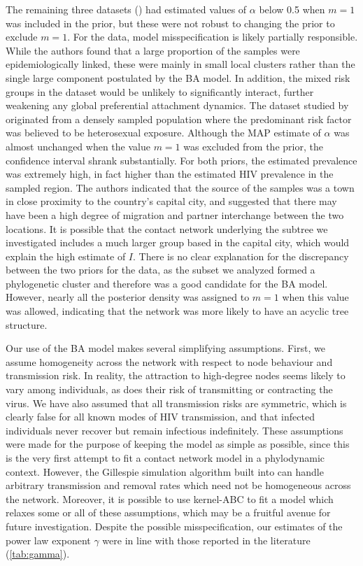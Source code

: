 The remaining three datasets (\textcite{cuevas2009hiv, novitsky2014impact,
li2015hiv}) had estimated values of $\alpha$ below 0.5 when $m = 1$ was
included in the prior, but these were not robust to changing the prior to
exclude $m = 1$. For the \citeauthor{cuevas2009hiv} data, model
misspecification is likely partially responsible. While the authors found that
a large proportion of the samples were epidemiologically linked, these were
mainly in small local clusters rather than the single large component
postulated by the BA model. In addition, the mixed risk groups in the dataset
would be unlikely to significantly interact, further weakening any global
preferential attachment dynamics. The dataset studied by
\textcite{novitsky2014impact} originated from a densely sampled population
where the predominant risk factor was believed to be heterosexual exposure.
Although the MAP estimate of $\alpha$ was almost unchanged when the value $m =
1$ was excluded from the prior, the confidence interval shrank substantially.
For both priors, the estimated prevalence was extremely high, in fact higher
than the estimated HIV prevalence in the sampled region. The authors indicated
that the source of the samples was a town in close proximity to the country's
capital city, and suggested that there may have been a high degree of migration
and partner interchange between the two locations. It is possible that the
contact network underlying the subtree we investigated includes a much larger
group based in the capital city, which would explain the high estimate of $I$.
There is no clear explanation for the discrepancy between the two priors for
the \textcite{li2015hiv} data, as the subset we analyzed formed a phylogenetic
cluster and therefore was a good candidate for the BA model. However, nearly
all the posterior density was assigned to $m = 1$ when this value was allowed,
indicating that the network was more likely to have an acyclic tree structure.

Our use of the \gls{BA} model makes several simplifying assumptions. First, we
assume homogeneity across the network with respect to node behaviour and
transmission risk. In reality, the attraction to high-degree nodes seems likely
to vary among individuals, as does their risk of transmitting or contracting
the virus. We have also assumed that all transmission risks are symmetric,
which is clearly false for all known modes of \gls{HIV} transmission, and that
infected individuals never recover but remain infectious indefinitely. These
assumptions were made for the purpose of keeping the model as simple as
possible, since this is the very first attempt to fit a contact network model
in a phylodynamic context. However, the Gillespie simulation algorithm built
into  can handle arbitrary transmission and removal rates
which need not be homogeneous across the network. Moreover, it is possible to
use kernel-\gls{ABC} to fit a model which relaxes some or all of these
assumptions, which may be a fruitful avenue for future investigation. Despite
the possible misspecification, our estimates of the power law exponent $\gamma$
were in line with those reported in the literature (\cref{tab:gamma}).
